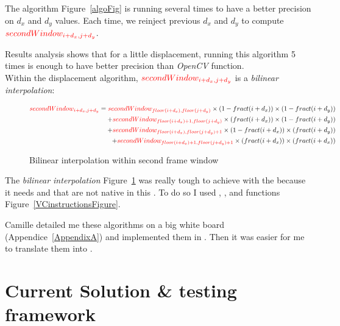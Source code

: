 The algorithm Figure~\ref{algoFig} is running several times to have a better precision on $d_{x}$ and $d_{y}$ values. Each time, we reinject previous $d_{x}$ and $d_{y}$ to compute $\textcolor{red}{secondWindow_{i+d_{x},j+d_{y}}}$.

Results analysis shows that for a little \feat{} displacement, running this algorithm 5 times is enough to have better precision than \emph{OpenCV} function.\\


Within the displacement algorithm, $\textcolor{red}{secondWindow_{i+d_{x},j+d_{y}}}$ is a \emph{bilinear interpolation}:

\begin{figure}[!htbp]
\begin{equation*}
	\begin{split}
		\textcolor{red}{secondWindow_{i+d_{x},j+d_{y}}} = \textcolor{red}{secondWindow_{floor(i+d_{x}),floor(j+d_{y})}}\times (1-fract(i+d_{x}))\times (1-fract(i+d_{y}))\\
		+ \textcolor{red}{secondWindow_{floor(i+d_{x})+1,floor(j+d_{y})}}\times (fract(i+d_{x}))\times (1-fract(i+d_{y}))\\
		+ \textcolor{red}{secondWindow_{floor(i+d_{x}),floor(j+d_{y})+1}}\times (1-fract(i+d_{x}))\times (fract(i+d_{y}))\\
		+ \textcolor{red}{secondWindow_{floor(i+d_{x})+1,floor(j+d_{y})+1}}\times (fract(i+d_{x}))\times (fract(i+d_{x}))
	\end{split}
\end{equation*}
\caption{Bilinear interpolation within second frame window}
\label{BIPFig}
\end{figure}
\FloatBarrier

The \emph{bilinear interpolation} Figure~\ref{BIPFig} was really tough to achieve with the \vc{} because it needs  and  that are not native in this . To do so I used , , and  functions Figure~\ref{VCinstructionsFigure}.


Camille detailed me these algorithms on a big white board (Appendice~\ref{AppendixA}) and implemented them in . Then it was easier for me to translate them into .


\section{Current Solution \& testing framework}

